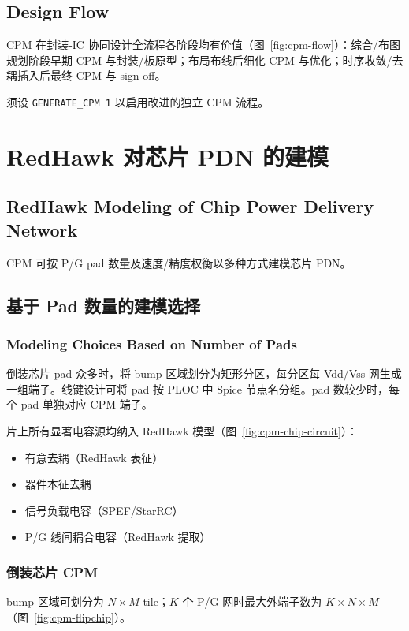 \subsection*{Design Flow}

CPM 在封装-IC 协同设计全流程各阶段均有价值（图~\ref{fig:cpm-flow}）：综合/布图规划阶段早期 CPM 与封装/板原型；布局布线后细化 CPM 与优化；时序收敛/去耦插入后最终 CPM 与 sign-off。


须设 \texttt{GENERATE\_CPM 1} 以启用改进的独立 CPM 流程。

\section{RedHawk 对芯片 PDN 的建模}
\subsection*{RedHawk Modeling of Chip Power Delivery Network}

CPM 可按 P/G pad 数量及速度/精度权衡以多种方式建模芯片 PDN。

\subsection{基于 Pad 数量的建模选择}
\subsubsection*{Modeling Choices Based on Number of Pads}

倒装芯片 pad 众多时，将 bump 区域划分为矩形分区，每分区每 Vdd/Vss 网生成一组端子。线键设计可将 pad 按 PLOC 中 Spice 节点名分组。pad 数较少时，每个 pad 单独对应 CPM 端子。

片上所有显著电容源均纳入 RedHawk 模型（图~\ref{fig:cpm-chip-circuit}）：
\begin{itemize}
  \item 有意去耦（RedHawk 表征）
  \item 器件本征去耦
  \item 信号负载电容（SPEF/StarRC）
  \item P/G 线间耦合电容（RedHawk 提取）
\end{itemize}


\subsubsection{倒装芯片 CPM}
bump 区域可划分为 $N \times M$ tile；$K$ 个 P/G 网时最大外端子数为 $K \times N \times M$（图~\ref{fig:cpm-flipchip}）。

